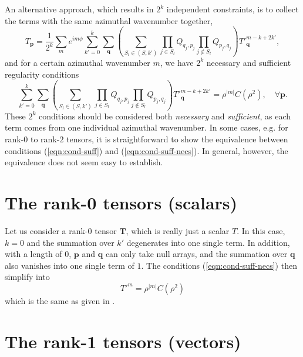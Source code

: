 \documentclass[a4paper, 11pt]{article}
\begin{document}
An alternative approach, which results in $2^k$ independent constraints, is to collect the terms with the same azimuthal wavenumber together, 
\[
    T_\mathbf{p} = \frac{1}{2^k} \sum_m e^{im\phi} \sum_{k'=0}^k \sum_\mathbf{q} \left(\sum_{S_l \in (S, k')} \prod_{j\in S_l} Q_{q_j,p_j} \prod_{j\notin S_l} Q_{p_{j},q_{j}}\right) T'^{m-k+2k'}_\mathbf{q},
\]
and for a certain azimuthal wavenumber $m$, we have $2^k$ necessary and sufficient regularity conditions
\begin{equation}\label{eqn:cond-suff-necs}
    \sum_{k'=0}^k \sum_{\mathbf{q}} \left(\sum_{S_l \in (S, k')} \prod_{j\in S_l} Q_{q_j,p_j} \prod_{j\notin S_l} Q_{p_{j},q_{j}}\right) T'^{m-k+2k'}_\mathbf{q} = \rho^{|m|} C(\rho^2),\quad \forall \mathbf{p}.
\end{equation}
These $2^k$ conditions should be considered both \textit{necessary} and \textit{sufficient}, as each term comes from one individual azimuthal wavenumber. In some cases, e.g. for rank-$0$ to rank-$2$ tensors, it is straightforward to show the equivalence between conditions (\ref{eqn:cond-suff}) and (\ref{eqn:cond-suff-necs}). In general, however, the equivalence does not seem easy to establish.


\section{The rank-0 tensors (scalars)}

Let us consider a rank-$0$ tensor $\mathbf{T}$, which is really just a scalar $T$. In this case, $k=0$ and the summation over $k'$ degenerates into one single term. In addition, with a length of $0$, $\mathbf{p}$ and $\mathbf{q}$ can only take null arrays, and the summation over $\mathbf{q}$ also vanishes into one single term of $1$. The conditions (\ref{eqn:cond-suff-necs}) then simplify into
\begin{equation}
    T'^m = \rho^{|m|} C(\rho^2)
\end{equation}
which is the same as given in \textcite{lewis_physical_1990}.


\section{The rank-1 tensors (vectors)}
\end{document}
